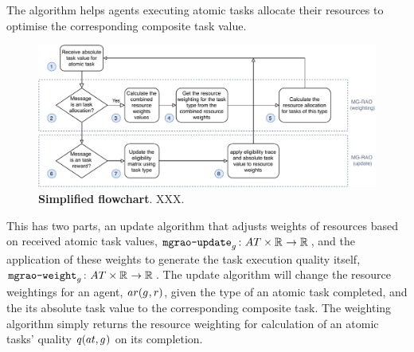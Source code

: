 The \acronymMGRAO{}{} algorithm helps agents executing atomic tasks allocate their resources to optimise the corresponding composite task value. 
\begin{figure}[ht]
	\centering
	\includegraphics[width=0.8\linewidth, trim={25pt 0pt 25pt 0pt, clip}]{mgrao-simplified}
	\caption{\textbf{Simplified \acronymMGRAO{}{} flowchart}. XXX.}
	\label{fig:mgrao-simplified}
\end{figure}

This has two parts, an update algorithm that adjusts weights of resources based on received atomic task values, $\label{eq:mgrao_update}\formalMGRAOUpdate{}{}$,  and the application of these weights to generate the task execution quality itself, $\label{eq:mgrao_weighting}\formalMGRAOWeighting{}{}$. The update algorithm will change the resource weightings for an agent, $\functionAgentResources{}{}$, given the type of an atomic task completed, and the its absolute task value to the corresponding composite task. The weighting algorithm simply returns the resource weighting for calculation of an atomic tasks' quality $\functionAtomicTaskQualitySignature{}{}$ on its completion.